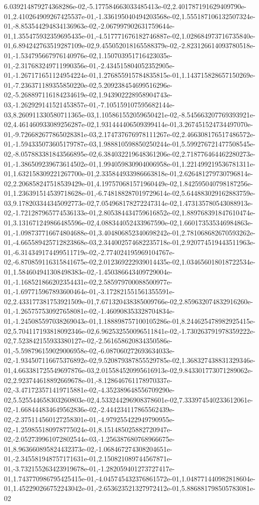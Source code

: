 6.039214879274368286e-02,-5.177584663033485413e-02,2.401787191629409790e-01,2.410264909267425537e-01,-1.336195040494203568e-02,1.555187106132507324e-01,-8.853544294834136963e-02,-2.067997902631759644e-01,1.355475932359695435e-01,-4.517771676182746887e-02,1.028684973716735840e-01,6.894242763519287109e-02,9.455052018165588379e-02,-2.823126614093780518e-01,-1.534795667976140976e-02,1.150703951716423035e-01,-2.317683249711990356e-01,-2.434515804052352905e-01,-1.267171651124954224e-01,1.276855915784835815e-01,1.143715828657150269e-01,-7.236371189355850220e-02,5.209238454699516296e-02,-5.268897116184234619e-02,1.943902228958904743e-03,-1.262929141521453857e-01,-7.105159107595682144e-03,8.260911330580711365e-03,1.105861552059650421e-02,-8.545663207769393921e-02,4.461460933089256287e-02,1.931444406509399414e-01,3.267451524734497070e-01,-9.726682677865028381e-03,2.174737676978111267e-02,2.466308176517486572e-01,-1.594335073605179787e-03,1.988810598850250244e-01,5.599276721477508545e-02,-8.057883381843566895e-02,6.384032219648361206e-02,2.718776464462280273e-01,-1.386509239673614502e-01,1.994059830904006958e-01,1.221499219536781311e-01,1.632158309221267700e-01,2.335844933986663818e-01,2.626481279730796814e-02,2.206858247518539429e-01,4.197570681571960449e-02,1.842595040798187256e-01,1.236391514539718628e-01,-6.748188287019729614e-02,5.644883029162883759e-03,9.178203344345092773e-02,7.054968178272247314e-02,1.473135780543088913e-02,-1.721287965774536133e-01,2.805384434759616852e-02,1.889768391847610474e-01,3.131671249866485596e-02,4.088344052433967590e-02,1.660173535346984863e-01,-1.098737716674804688e-01,3.404806852340698242e-01,2.781068682670593262e-01,-4.665589425712823868e-03,2.344002574682235718e-01,2.920774519443511963e-01,-6.314349174499511719e-02,-2.774024195969104767e-02,-6.870859116315841675e-02,2.012369222939014435e-02,1.034656018018722534e-01,1.584604941308498383e-02,-1.450386643409729004e-01,-1.168521866202354431e-02,2.585979700088500977e-01,-1.697715967893600464e-01,-3.172821551561355591e-02,2.433177381753921509e-01,7.671320438385009766e-02,2.859632074832916260e-01,-1.265757530927658081e-02,-1.460908353328704834e-01,-1.245085597038269043e-01,1.188898757100105286e-01,8.244625478982925415e-02,5.704117193818092346e-02,6.962532550096511841e-02,-1.730263791978359222e-02,7.523842155933380127e-02,-2.561658620834350586e-01,-5.598796159029006958e-02,-6.087060272693634033e-02,-1.934507116675376892e-02,9.520879387855529785e-02,1.368327438831329346e-01,4.663381725549697876e-03,2.015584520995616913e-02,9.843301773071289062e-02,2.923744618892669678e-01,-8.128646761178970337e-02,-3.471723571419715881e-02,-4.352389648556709290e-02,5.525544658303260803e-02,4.533244296908378601e-02,7.333974540233612061e-02,-1.668444834649562836e-02,-2.444234117865562439e-02,-2.375114560127258301e-01,-4.979255422949790955e-02,-1.259855180978775024e-01,8.151485025882720947e-02,-2.052739961072802544e-03,-1.256387680768966675e-01,8.963660895824432373e-02,-1.068467274308204651e-01,-2.345581948757171631e-01,2.150821089744567871e-01,-3.732155263423919678e-01,-1.282059401273727417e-01,1.743770986795425415e-01,-4.045745432376861572e-01,1.048771440982818604e-01,1.452290266752243042e-01,-2.653623521327972412e-01,5.886881798505783081e-02
